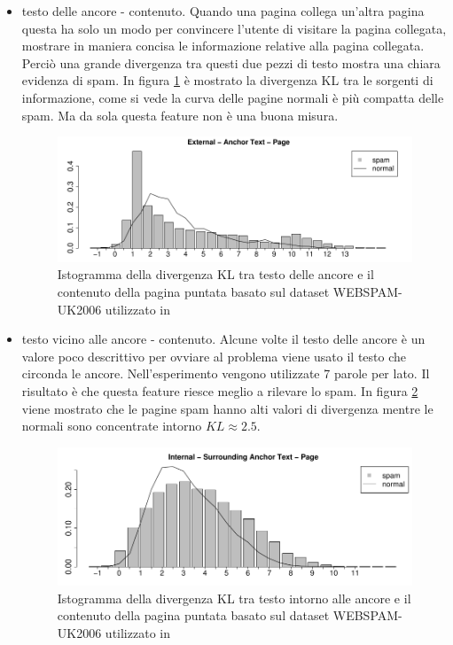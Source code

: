 \begin{itemize}
\item testo delle ancore - contenuto. Quando una pagina collega un'altra pagina questa ha solo un modo per convincere l'utente di visitare la pagina collegata, mostrare in maniera concisa le informazione relative alla pagina collegata. Perciò una grande divergenza tra questi due pezzi di testo mostra una chiara evidenza di spam. In figura \ref{fig:martinez1} è mostrato la divergenza KL tra le sorgenti di informazione, come si vede la curva delle pagine normali è più compatta delle spam. Ma da sola questa feature non è una buona misura.
\begin{figure}[htbp]
\centering
\includegraphics[width=12cm]{immagini/martinez/martinez1}
\caption{Istogramma della divergenza KL tra testo delle ancore e il contenuto della pagina puntata basato sul dataset WEBSPAM-UK2006 utilizzato in \cite{Martinez-Romo:2009:WSI:1531914.1531920}}
\label{fig:martinez1}
\end{figure}

\item testo vicino alle ancore - contenuto. Alcune volte il testo delle ancore è un valore poco descrittivo per ovviare al problema viene usato il testo che circonda le ancore. Nell'esperimento vengono utilizzate 7 parole per lato. Il risultato è che questa feature riesce meglio a rilevare lo spam. In figura \ref{fig:martinez2} viene mostrato che le pagine spam hanno alti valori di divergenza mentre le normali sono concentrate intorno \(KL \approx  2.5\).
\begin{figure}[htbp]
\centering
\includegraphics[width=12cm]{immagini/martinez/martinez2}
\caption{Istogramma della divergenza KL tra testo intorno alle ancore e il contenuto della pagina puntata basato sul dataset WEBSPAM-UK2006 utilizzato in \cite{Martinez-Romo:2009:WSI:1531914.1531920}}
\label{fig:martinez2}
\end{figure}


\end{itemize}
